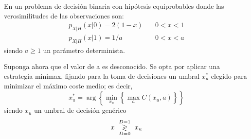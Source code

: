 \ifspanish

\question En un problema de decisión binaria con hipótesis equiprobables donde las verosimilitudes de las observaciones son:
 $$\begin{array}{ll}
 p_{X|H}(x|0)=2 \left(1-x \right) & \quad 0<x<1 \\
  p_{X|H}(x|1)=1/a & \quad 0<x<a
 \end{array}$$
siendo $a\geq1$ un parámetro determinista.
Suponga ahora que el valor de a es desconocido. Se opta por aplicar una estrategia  minimax, fijando para la toma de decisiones un umbral  $x_u^*$ elegido para minimizar el máximo coste medio; es decir, 
 $$x_u^*=\arg \left\lbrace \min_{x_u}  \left\lbrace \max_a C(x_u,a)  \right\rbrace  \right\rbrace  $$
siendo  $x_u$ un umbral de decisión genérico
		 $$x \,\, \underset{D=0}{\overset{D=1}{\gtrless}}\,\, x_u$$
\begin{solution}
\end{solution}


